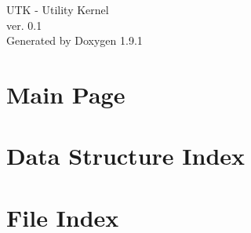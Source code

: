 \let\mypdfximage\pdfximage\def\pdfximage{\immediate\mypdfximage}\documentclass[twoside]{book}
\newcommand{\+}{\discretionary{\mbox{\scriptsize$\hookleftarrow$}}{}{}}
\newcommand{\clearemptydoublepage}{%
  \newpage{\pagestyle{empty}\cleardoublepage}%
}
\begin{document}
\raggedbottom

\hypersetup{pageanchor=false,
             bookmarksnumbered=true,
             pdfencoding=unicode
            }
\begin{titlepage}
\vspace*{7cm}
\begin{center}%
{\Large UTK -\/ Utility Kernel \\[1ex]\large ver. 0.\+1 }\\
\vspace*{1cm}
{\large Generated by Doxygen 1.9.1}\\
\end{center}
\end{titlepage}
\clearemptydoublepage
{}
\tableofcontents
\clearemptydoublepage
{}
\hypersetup{pageanchor=true}

\chapter{Main Page}
\label{index}\hypertarget{index}{}
\chapter{Data Structure Index}

\chapter{File Index}

\end{document}
